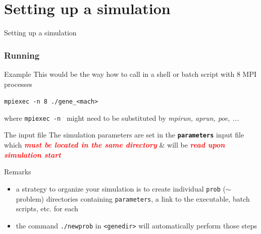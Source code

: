\documentclass[10pt]{beamer}
\newcommand{\cR}[1]{\textcolor{red}{#1}}
\begin{document}

\section{Setting up a simulation}

\begin{frame}[plain]

\begin{center}

\begin{exampleblock}

\begin{center}
\LARGE
Setting up a simulation%
\end{center}
\end{exampleblock}

\end{center}
\end{frame}


\begin{frame}[fragile]
   \frametitle{Running \gene}

\begin{exampleblock}{Example}
This would be the way how to call \gene in a shell or batch script with 8 MPI processes
 
\verb|mpiexec -n 8 ./gene_<mach>|

where \verb|mpiexec -n | might need to be substituted by {\em mpirun, aprun, poe, ...}
\end{exampleblock}

\begin{alertblock}{The input file}
The simulation parameters are set in the {\bf \tt parameters} input file which \cR{\bf \em must be located in the same directory} \& will be \cR{\bf\em read upon simulation start}
\end{alertblock}

\begin{block}{Remarks}
\begin{itemize}
 \item a strategy to organize your simulation is to create individual {\tt prob} ($\sim$ problem) directories containing {\tt parameters}, a link to the executable, batch scripts, etc. for each
 \item the command {\tt ./newprob} in {\tt <genedir>} will automatically perform those steps
\end{itemize}
 
\end{block} 
\end{frame}
\end{document}
